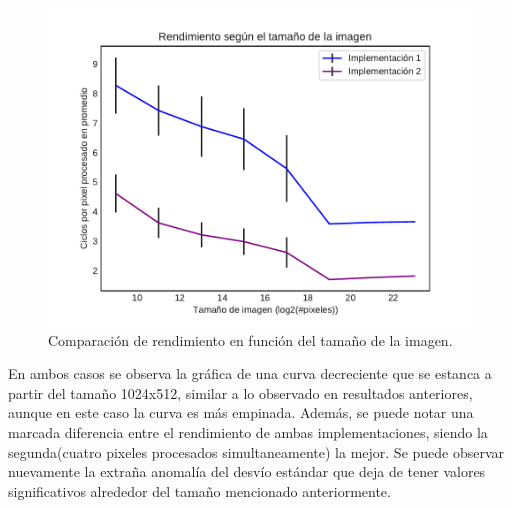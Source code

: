 \documentclass[a4paper]{article}
\begin{document}
\begin{figure}[h]
	\centering
	\includegraphics[scale=0.60]{img/ReforzarBrillo2vs4.pdf}
	\caption{Comparación de rendimiento en función del tamaño de la imagen.}
\end{figure}	
\justify
En ambos casos se observa la gráfica de una curva decreciente que se estanca a partir del tamaño 1024x512, similar a lo observado en resultados anteriores, aunque en este caso la curva es más empinada. Además, se puede notar una marcada diferencia entre el rendimiento de ambas implementaciones, siendo la segunda(cuatro pixeles procesados simultaneamente) la mejor.
\justify
Se puede observar nuevamente la extraña anomalía del desvío estándar que deja de tener valores significativos alrededor del tamaño mencionado anteriormente.
\end{document}
